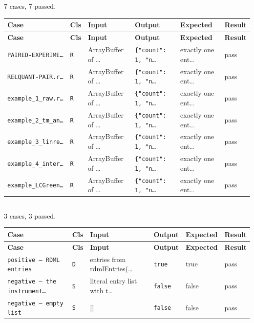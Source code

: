 \subsection*{}
{\small 7 cases, 7 passed.}\par
{\small
\begin{xltabular}{\linewidth}{|X|l|l|l|l|l|}
\toprule \textbf{Case} & \textbf{Cls} & \textbf{Input} & \textbf{Output} & \textbf{Expected} & \textbf{Result} \\\midrule\endfirsthead
\toprule \textbf{Case} & \textbf{Cls} & \textbf{Input} & \textbf{Output} & \textbf{Expected} & \textbf{Result} \\\midrule\endhead
\texttt{PAIRED-EXPERIME…} & \texttt{R} & ArrayBuffer of … & \texttt{\{"count": 1, "n…} & exactly one ent… & pass \\
\texttt{RELQUANT-PAIR.r…} & \texttt{R} & ArrayBuffer of … & \texttt{\{"count": 1, "n…} & exactly one ent… & pass \\
\texttt{example\_1\_raw.r…} & \texttt{R} & ArrayBuffer of … & \texttt{\{"count": 1, "n…} & exactly one ent… & pass \\
\texttt{example\_2\_tm\_an…} & \texttt{R} & ArrayBuffer of … & \texttt{\{"count": 1, "n…} & exactly one ent… & pass \\
\texttt{example\_3\_linre…} & \texttt{R} & ArrayBuffer of … & \texttt{\{"count": 1, "n…} & exactly one ent… & pass \\
\texttt{example\_4\_inter…} & \texttt{R} & ArrayBuffer of … & \texttt{\{"count": 1, "n…} & exactly one ent… & pass \\
\texttt{example\_LCGreen…} & \texttt{R} & ArrayBuffer of … & \texttt{\{"count": 1, "n…} & exactly one ent… & pass \\
\bottomrule
\end{xltabular}}

\subsection*{}
{\small 3 cases, 3 passed.}\par
{\small
\begin{xltabular}{\linewidth}{|X|l|l|l|l|l|}
\toprule \textbf{Case} & \textbf{Cls} & \textbf{Input} & \textbf{Output} & \textbf{Expected} & \textbf{Result} \\\midrule\endfirsthead
\toprule \textbf{Case} & \textbf{Cls} & \textbf{Input} & \textbf{Output} & \textbf{Expected} & \textbf{Result} \\\midrule\endhead
\texttt{positive — RDML entries} & \texttt{D} & entries from rdmlEntries(… & \texttt{true} & true & pass \\
\texttt{negative — the instrument…} & \texttt{S} & literal entry list with t… & \texttt{false} & false & pass \\
\texttt{negative — empty list} & \texttt{S} & [] & \texttt{false} & false & pass \\
\bottomrule
\end{xltabular}}

